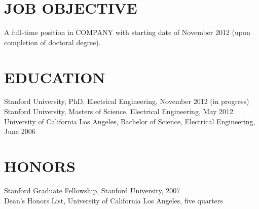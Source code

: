 \documentclass{res}
\begin{document}
 

\address{\texttt{jesselu@stanford.edu} \\ 66 Newell Rd. Apt. O \\ East Palo Alto, CA \\ (408) 568-9356}
                                  
\begin{resume}

\section{JOB OBJECTIVE}          
    A full-time position in COMPANY with starting date of November 2012 
    (upon completion of doctoral degree).

\section{EDUCATION}          
    Stanford University, PhD, Electrical Engineering, November 2012 (in progress) \\
    Stanford University, Masters of Science, Electrical Engineering, May 2012 \\
    University of California Los Angeles, Bachelor of Science, Electrical Engineering, June 2006

\section{HONORS}
    Stanford Graduate Fellowship, Stanford University, 2007 \\
    Dean's Honors List, University of California Los Angeles, five quarters
 

\end{resume}
\end{document}
